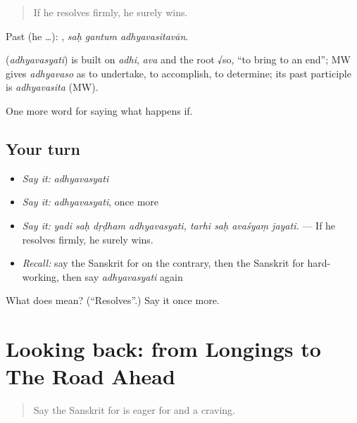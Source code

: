 \begin{quote}
If he resolves firmly, he surely wins.
\end{quote}

Past (he …):   , \emph{saḥ gantum adhyavasitavān}.

\begin{cousinweb}
\textbf{} (\emph{adhyavasyati}) is built on \emph{adhi}, \emph{ava} and the root √so, \textquotedblleft{}to bring to an end\textquotedblright{}; MW gives \emph{adhyavaso} as to undertake, to accomplish, to determine; its past participle is \emph{adhyavasita} (MW).
\end{cousinweb}

\begin{grammarlens}[title={What you've built}]
One more word for saying what happens if.
\end{grammarlens}

\subsection*{Your turn}
\begin{itemize}
\raggedright
  \item \emph{Say it:} \emph{adhyavasyati}
  \item \emph{Say it:} \emph{adhyavasyati}, once more
  \item \emph{Say it:} \emph{yadi saḥ dṛḍham adhyavasyati, tarhi saḥ avaśyaṃ jayati.} — If he resolves firmly, he surely wins.
  \item \emph{Recall:} say the Sanskrit for on the contrary, then the Sanskrit for hard-working, then say \emph{adhyavasyati} again
\end{itemize}

\begin{tcolorbox}[breakable,colback=teal!4,colframe=teal!35!black,title={Before you move on}]
What does  mean? (\textquotedblleft{}Resolves\textquotedblright{}.) Say it once more.
\end{tcolorbox}
\section[(dialogue)]{Looking back: from Longings to The Road Ahead}

\label{lesson:SA-R555-review-549-555}



\begin{quote}
Say the Sanskrit for is eager for and a craving.
\end{quote}


